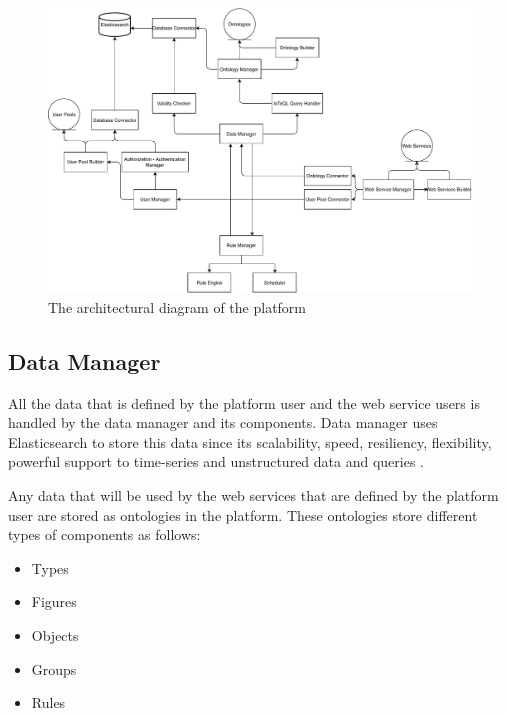 \begin{figure}[htpb]
  \centering
  \includegraphics[width=\textwidth,height=\textheight,keepaspectratio]{figures/architectural_diagram.pdf}
  \caption[Platform Architecture]{The architectural diagram of the platform}\label{fig:architecture}
\end{figure}

\subsection{Data Manager}

All the data that is defined by the platform user and the web service users is handled by the data manager and its components. Data manager uses Elasticsearch to store this data since its scalability, speed, resiliency, flexibility, powerful support to time-series and unstructured data and queries \cite{elastic, elastic_time}.

Any data that will be used by the web services that are defined by the platform user are stored as ontologies in the platform. These ontologies store different types of components as follows:

\begin{itemize}
  \item Types
  \item Figures
  \item Objects
  \item Groups
  \item Rules
\end{itemize}

